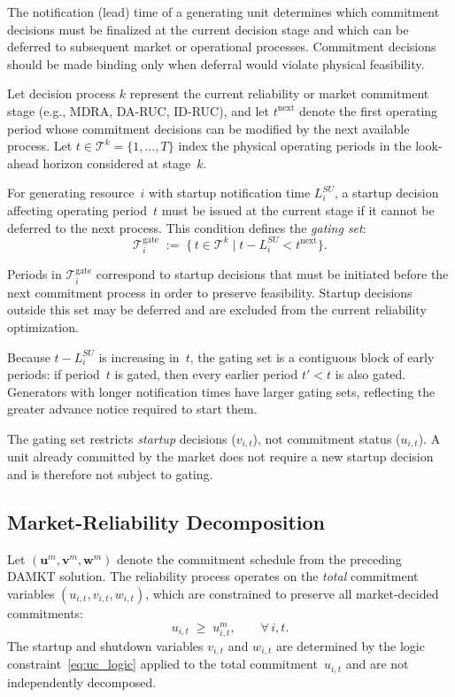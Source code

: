 \documentclass[journal]{IEEEtran}
\begin{document}
The notification (lead) time of a generating unit determines which
commitment decisions must be finalized at the current decision stage
and which can be deferred to subsequent market or operational
processes.
Commitment decisions should be made binding only when deferral would
violate physical feasibility.

Let decision process $k$ represent the current reliability or market
commitment stage (e.g., MDRA, DA-RUC, ID-RUC), and let
$t^{\text{next}}$ denote the first operating period whose commitment
decisions can be modified by the next available process.
Let $t \in \mathcal{T}^k = \{1,\dots,T\}$ index the physical
operating periods in the look-ahead horizon considered at stage~$k$.

For generating resource~$i$ with startup notification time
$L_i^{SU}$, a startup decision affecting operating period~$t$ must
be issued at the current stage if it cannot be deferred to the next
process.
This condition defines the \emph{gating set}:
\begin{equation}\label{eq:gating_set}
    \mathcal{T}_{i}^{\text{gate}} \;:=\;
    \bigl\{\, t \in \mathcal{T}^k \;\big|\;
            t - L_i^{SU} < t^{\text{next}} \bigr\}.
\end{equation}

Periods in $\mathcal{T}_{i}^{\text{gate}}$ correspond to startup
decisions that must be initiated before the next commitment process
in order to preserve feasibility.
Startup decisions outside this set may be deferred and are excluded
from the current reliability optimization.

Because $t - L_i^{SU}$ is increasing in~$t$, the gating set is a
contiguous block of early periods: if period~$t$ is gated, then every
earlier period $t' < t$ is also gated.
Generators with longer notification times have larger gating sets,
reflecting the greater advance notice required to start them.

The gating set restricts \emph{startup} decisions ($v_{i,t}$), not
commitment status ($u_{i,t}$).
A unit already committed by the market does not require a new startup
decision and is therefore not subject to gating.

\subsection{Market-Reliability Decomposition}\label{sec:decomp}

Let $(\mathbf{u}^m, \mathbf{v}^m, \mathbf{w}^m)$ denote the
commitment schedule from the preceding DAMKT solution.
The reliability process operates on the \emph{total} commitment
variables $(u_{i,t}, v_{i,t}, w_{i,t})$, which are constrained to
preserve all market-decided commitments:
\begin{equation}\label{eq:nodecommit}
    u_{i,t} \;\geq\; u_{i,t}^m, \qquad \forall\, i,t.
\end{equation}
The startup and shutdown variables $v_{i,t}$ and $w_{i,t}$ are
determined by the logic constraint~\eqref{eq:uc_logic} applied to the
total commitment~$u_{i,t}$ and are not independently decomposed.
\end{document}
